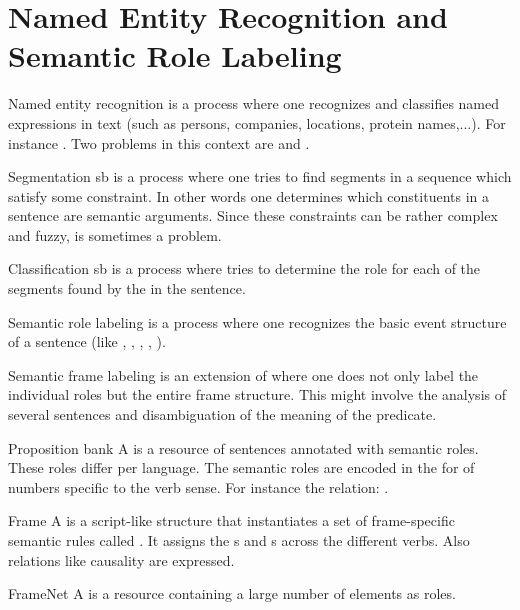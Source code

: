 \section{Named Entity Recognition and Semantic Role Labeling}
\begin{df}{Named entity recognition}
\sb{} is a process where one recognizes and classifies named expressions in text (such as persons, companies, locations, protein names,...). For instance . Two problems in this context are  and .
\end{df}
\begin{df}{Segmentation}
sb{} is a process where one tries to find segments in a sequence which satisfy some constraint. In other words one determines which constituents in a sentence are semantic arguments. Since these constraints can be rather complex and fuzzy, \sb{} is sometimes a problem.
\end{df}
\begin{df}[Recognition]{Classification}
sb{} is a process where tries to determine the role for each of the segments found by the  in the sentence.
\end{df}
\begin{df}{Semantic role labeling}
\sb{} is a process where one recognizes the basic event structure of a sentence (like , , , , ).
\end{df}
\begin{df}{Semantic frame labeling}
\sb{} is an extension of  where one does not only label the individual roles but the entire frame structure. This might involve the analysis of several sentences and disambiguation of the meaning of the predicate.
\end{df}
\begin{df}[ProBank]{Proposition bank}
A \sb{} is a resource of sentences annotated with semantic roles. These roles differ per language. The semantic roles are encoded in the for of numbers specific to the verb sense. For instance the  relation: .
\end{df}
\begin{df}{Frame}
A \sb{} is a script-like structure that instantiates a set of frame-specific semantic rules called . It assigns the s and s across the different verbs. Also relations like causality are expressed.
\end{df}
\begin{df}{FrameNet}
A \sb{} is a resource containing a large number of  elements as roles.
\end{df}
